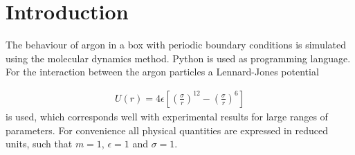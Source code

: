 \section{Introduction}
The behaviour of argon in a box with periodic boundary conditions is simulated using the molecular dynamics method. Python is used as programming language. For the interaction between the argon particles a Lennard-Jones potential

\begin{gather}
U(r) = 4\epsilon \left[\left(\frac{\sigma}{r}\right)^12-\left(\frac{\sigma}{r}\right)^6\right]
\end{gather}
is used, which corresponds well with experimental results for large ranges of parameters\cite{hoover1970comparison}. For convenience all physical quantities are expressed in reduced units, such that $m=1$, $\epsilon = 1$ and $\sigma = 1$. 


